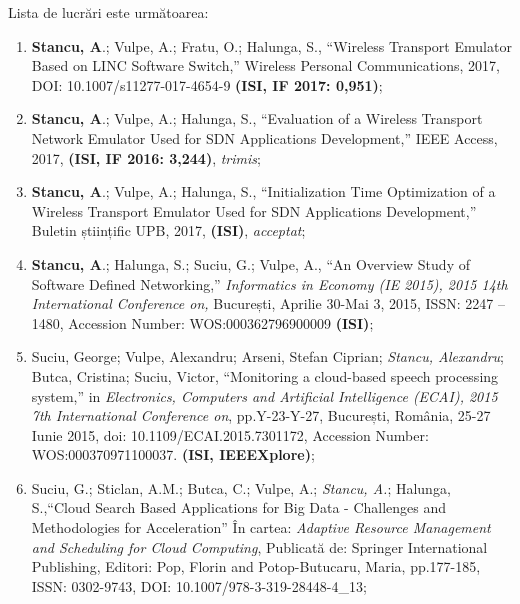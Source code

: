 Lista de lucrări este următoarea:
\begin{enumerate}
	\item \textbf{Stancu, A}.; Vulpe, A.; Fratu, O.; Halunga, S., ``Wireless Transport Emulator Based on LINC Software Switch,'' Wireless Personal Communications, 2017, DOI: 10.1007/s11277-017-4654-9 \textbf{(ISI, IF 2017: 0,951)}\label{item:wte_linc};
	
	\item \textbf{Stancu, A}.; Vulpe, A.; Halunga, S., ``Evaluation of a Wireless Transport Network Emulator Used for SDN Applications Development,'' IEEE Access, 2017, \textbf{(ISI, IF 2016: 3,244)}, \textit{trimis}\label{item:wte_evaluation};
	
	\item \textbf{Stancu, A}.; Vulpe, A.; Halunga, S., ``Initialization Time Optimization of a Wireless Transport Emulator Used for SDN Applications Development,'' Buletin științific UPB, 2017, \textbf{(ISI)}, \textit{acceptat}\label{item:wte_init_optimization};
	
	\item \textbf{Stancu, A}.; Halunga, S.; Suciu, G.; Vulpe, A., ``An Overview Study of Software Defined Networking,'' \textit{Informatics in Economy (IE 2015), 2015 14th International Conference on,} București, Aprilie 30-Mai 3, 2015, ISSN: 2247 – 1480, Accession Number: WOS:000362796900009 \textbf{(ISI)}\label{item:overview_sdn};
	
	\item Suciu, George; Vulpe, Alexandru; Arseni, Stefan Ciprian; \textit{Stancu, Alexandru}; Butca, Cristina; Suciu, Victor, ``Monitoring a cloud-based speech processing system,'' in \textit{Electronics, Computers and Artificial Intelligence (ECAI), 2015 7th International Conference on}, pp.Y-23-Y-27, București, România, 25-27 Iunie 2015, doi: 10.1109/ECAI.2015.7301172, Accession Number: WOS:000370971100037. \textbf{(ISI, IEEEXplore)};
	
	\item Suciu, G.; Sticlan, A.M.; Butca, C.; Vulpe, A.; \textit{Stancu, A.}; Halunga, S.,``Cloud Search Based Applications for Big Data - Challenges and Methodologies for Acceleration'' În cartea: \textit{Adaptive Resource Management and Scheduling for Cloud Computing}, Publicată de: Springer International Publishing, Editori: Pop, Florin and Potop-Butucaru, Maria, pp.177-185, ISSN: 0302-9743, DOI: 10.1007/978-3-319-28448-4\_13;
	

\end{enumerate}
